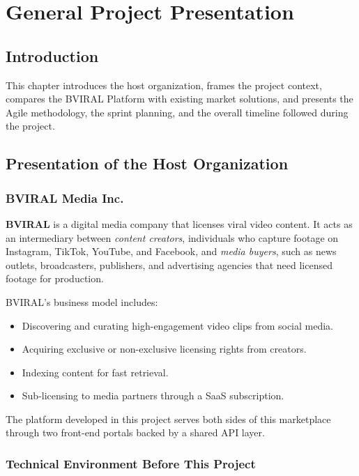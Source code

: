 \chapter{General Project Presentation}

\section*{Introduction}

This chapter introduces the host organization, frames the project context, compares the BVIRAL
Platform with existing market solutions, and presents the Agile methodology, the sprint planning,
and the overall timeline followed during the project.

\section{Presentation of the Host Organization}

\subsection{BVIRAL Media Inc.}

\textbf{BVIRAL} is a digital media company that licenses viral video content. It acts as an
intermediary between \textit{content creators}, individuals who capture footage on Instagram,
TikTok, YouTube, and Facebook, and \textit{media buyers}, such as news outlets, broadcasters,
publishers, and advertising agencies that need licensed footage for production.

BVIRAL's business model includes:

\begin{itemize}
  \item Discovering and curating high-engagement video clips from social media.
  \item Acquiring exclusive or non-exclusive licensing rights from creators.
  \item Indexing content for fast retrieval.
  \item Sub-licensing to media partners through a SaaS subscription.
\end{itemize}

The platform developed in this project serves both sides of this marketplace through two front-end
portals backed by a shared API layer.

\subsection{Technical Environment Before This Project}

